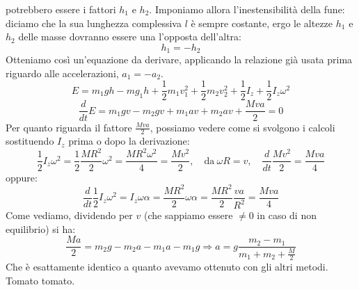\documentclass[a4paper,12pt]{article}
\begin{document}
potrebbero essere i fattori $h_1$ e $h_2$. Imponiamo allora l'inestensibilità della fune: diciamo che la sua lunghezza complessiva $l$ è sempre costante,
ergo le altezze $h_1$ e $h_2$ delle masse dovranno essere una l'opposta dell'altra:
$$ h_1 = -h_2 $$ 
Otteniamo così un'equazione da derivare, applicando la relazione già usata prima riguardo alle accelerazioni, $a_1 = -a_2$.
$$ E = m_1gh-mg_1h + \frac{1}{2}m_1v_1^2 + \frac{1}{2}m_2v_2^2+\frac{1}{2}I_z + \frac{1}{2}I_z\omega^2$$
$$ \frac{d}{dt}E = m_1gv-m_2gv+m_1av+m_2av+\frac{Mva}{2} = 0$$
Per quanto riguarda il fattore $\frac{Mva}{2}$, possiamo vedere come si svolgono i calcoli sostituendo $I_z$ prima o dopo la derivazione:
$$ \frac{1}{2}I_z\omega^2 = \frac{1}{2}\frac{MR^2}{2}\omega^2 = \frac{MR^2\omega^2}{4} =  \frac{Mv^2}{2}, \quad \mathrm{da} \ \omega R = v, \quad \frac{d}{dt}\frac{Mv^2}{2} = \frac{Mva}{4}$$
oppure:
$$ \frac{d}{dt}\frac{1}{2}I_z\omega^2 = I_z\omega\alpha = \frac{MR^2}{2}\omega\alpha = \frac{MR^2}{2} \frac{va}{R^2} = \frac{Mva}{4}$$
Come vediamo, dividendo per $v$ (che sappiamo essere $\neq 0$ in caso di non equilibrio) si ha:
$$ \frac{Ma}{2} =  m_2g-m_2a-m_1a-m_1g \Rightarrow a = g\frac{m_2-m_1}{m_1+m_2+\frac{M}{2}}$$
Che è esattamente identico a quanto avevamo ottenuto con gli altri metodi. Tomato tomato.
\end{document}
